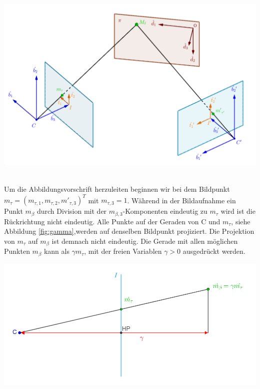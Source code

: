 \begin{minipage}{\linewidth}
	\centering
	\includegraphics[width=0.8\linewidth]{images/HomographieDP_beschriftet.png}
	\label{fig:Homographie}
\end{minipage}\\

Um die Abbildungsvorschrift herzuleiten beginnen wir bei dem Bildpunkt \ensuremath{m_{\tau} = (m_{\tau,1},m_{\tau,2},m'_{\tau,3})^T} mit $m_{\tau,3}=1$. Während in der Bildaufnahme ein Punkt $m_\beta$ durch Division mit der $m_{\beta,3}$-Komponenten eindeutig zu $m_{\tau}$ wird ist die Rückrichtung nicht eindeutig. Alle Punkte auf der Geraden von C und $m_{\tau}$, siehe Abbildung \ref{fig:gamma},werden auf denselben Bildpunkt projiziert. Die Projektion von $m_{\tau}$ auf $m_\beta$ ist demnach nicht eindeutig. Die Gerade mit allen möglichen Punkten $m_\beta$ kann als $\gamma m_{\tau}$, mit der freien Variablen $\gamma > 0$ ausgedrückt werden.  


\begin{minipage}{\linewidth}
	\centering
	\includegraphics[width=0.8\linewidth]{images/gamma.png}
	\label{fig:gamma}
\end{minipage}\\


